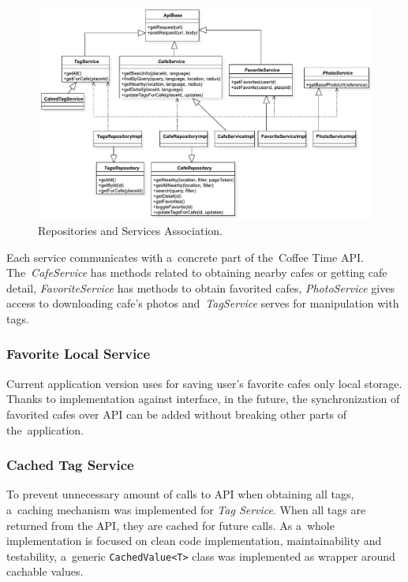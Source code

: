 \begin{figure}[ht]
    \centering
    \includegraphics[width=\textwidth,angle=270,origin=c]{img/implementation/repo-services.pdf}
    \caption{Repositories and Services Association.}
    \label{fig:ct-repo-services}
\end{figure}

Each service communicates with a~concrete part of the~Coffee Time API. The~\textit{CafeService} has methods related to obtaining nearby cafes or getting cafe detail, \textit{FavoriteService} has methods to obtain favorited cafes, \textit{PhotoService} gives access to downloading cafe's photos and~\textit{TagService} serves for manipulation with tags.

\subsubsection{Favorite Local Service}
Current application version uses for saving user's favorite cafes only local storage. Thanks to implementation against interface, in the future, the synchronization of favorited cafes over API can be added without breaking other parts of the~application. 

\subsubsection{Cached Tag Service}
To prevent unnecessary amount of calls to API when obtaining all tags, a~caching mechanism was implemented for \textit{Tag Service}. When all tags are returned from the API, they are cached for future calls. As a~whole implementation is focused on clean code implementation, maintainability and testability, a~generic \verb|CachedValue<T>| class was implemented as wrapper around cachable values. 

